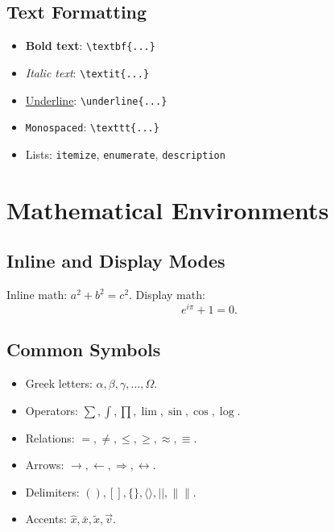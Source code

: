 \documentclass[12pt,a4paper]{article}
\begin{document}
\subsection{Text Formatting}
\begin{itemize}
  \item \textbf{Bold text}: \texttt{\textbackslash textbf\{...\}}
  \item \textit{Italic text}: \texttt{\textbackslash textit\{...\}}
  \item \underline{Underline}: \texttt{\textbackslash underline\{...\}}
  \item \texttt{Monospaced}: \texttt{\textbackslash texttt\{...\}}
  \item Lists: \texttt{itemize}, \texttt{enumerate}, \texttt{description}
\end{itemize}

\section{Mathematical Environments}

\subsection{Inline and Display Modes}
Inline math: \( a^2 + b^2 = c^2 \). Display math:
\[
  e^{i\pi} + 1 = 0.
\]

\subsection{Common Symbols}
\begin{itemize}
  \item Greek letters: $\alpha,\beta,\gamma,\ldots,\Omega$.
  \item Operators: $\sum,\int,\prod,\lim,\sin,\cos,\log$.
  \item Relations: $=,\neq,\le,\ge,\approx,\equiv$.
  \item Arrows: $\rightarrow,\leftarrow,\Rightarrow,\leftrightarrow$.
  \item Delimiters: $( ),[ ],\{ \},\langle \rangle,\lvert \rvert,\lVert \rVert$.
  \item Accents: $\hat x,\bar x,\tilde x,\vec v$.
\end{itemize}

\end{document}
